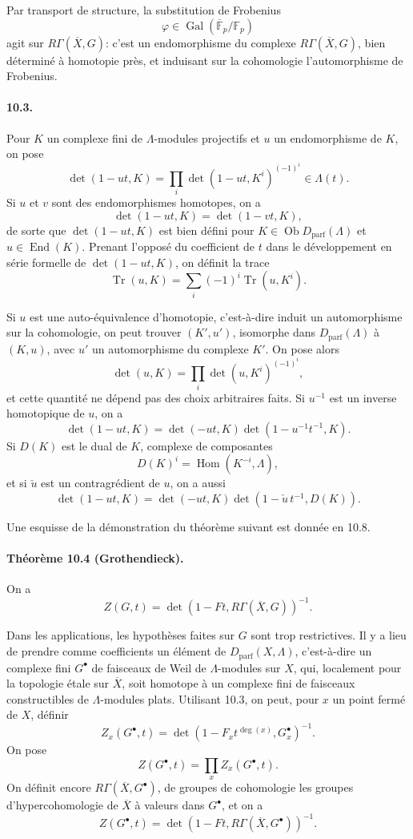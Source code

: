 \documentclass[10pt]{article}
\newcommand{\F}{\mathbb F}
\newcommand{\Gal}{\operatorname{Gal}}
\newcommand{\Hom}{\operatorname{Hom}}
\newcommand{\Tr}{\operatorname{Tr}}
\providecommand{\Gal}{\operatorname{Gal}}
\providecommand{\Hom}{\operatorname{Hom}}
\providecommand{\End}{\operatorname{End}}
\providecommand{\Gal}{\operatorname{Gal}}
\providecommand{\Hom}{\operatorname{Hom}}
\providecommand{\Tr}{\operatorname{Tr}}
\providecommand{\Dparf}{D_{\mathrm{parf}}}
\providecommand{\Gal}{\operatorname{Gal}}
\providecommand{\Hom}{\operatorname{Hom}}
\providecommand{\End}{\operatorname{End}}
\providecommand{\Tr}{\operatorname{Tr}}
\providecommand{\Gal}{\operatorname{Gal}}
\providecommand{\Tr}{\operatorname{Tr}}
\begin{document}
Par transport de structure, la substitution de Frobenius
\[
\varphi\in\Gal(\overline{\F}_p/\F_p)
\]
agit sur \(R\Gamma(\overline X,G)\): c'est un endomorphisme du complexe \(R\Gamma(\overline X,G)\), bien déterminé à homotopie près, et induisant sur la cohomologie l'automorphisme de Frobenius.

\paragraph{10.3.} Pour \(K\) un complexe fini de \(\Lambda\)-modules projectifs et \(u\) un endomorphisme de \(K\), on pose
\[
\tag{10.3.1}
\det(1-ut,K)=
\prod_i\det(1-ut,K^i)^{(-1)^i}\in\Lambda(t).
\]
Si \(u\) et \(v\) sont des endomorphismes homotopes, on a
\[
\det(1-ut,K)=\det(1-vt,K),
\]
de sorte que \(\det(1-ut,K)\) est bien défini pour \(K\in\operatorname{Ob}\Dparf(\Lambda)\) et \(u\in\End(K)\). Prenant l'opposé du coefficient de \(t\) dans le développement en série formelle de \(\det(1-ut,K)\), on définit la trace
\[
\tag{10.3.2}
\Tr(u,K)=\sum_i(-1)^i\Tr(u,K^i).
\]

Si \(u\) est une auto-équivalence d'homotopie, c'est-à-dire induit un automorphisme sur la cohomologie, on peut trouver \((K',u')\), isomorphe dans \(\Dparf(\Lambda)\) à \((K,u)\), avec \(u'\) un automorphisme du complexe \(K'\). On pose alors
\[
\tag{10.3.3}
\det(u,K)=\prod_i\det(u,K^i)^{(-1)^i},
\]
et cette quantité ne dépend pas des choix arbitraires faits. Si \(u^{-1}\) est un inverse homotopique de \(u\), on a
\[
\tag{10.3.4}
\det(1-ut,K)=\det(-ut,K)\det(1-u^{-1}t^{-1},K).
\]
Si \(D(K)\) est le dual de \(K\), complexe de composantes
\[
D(K)^i=\Hom(K^{-i},\Lambda),
\]
et si \(\check u\) est un contragrédient de \(u\), on a aussi
\[
\tag{10.3.5}
\det(1-ut,K)=\det(-ut,K)\det(1-\check u\,t^{-1},D(K)).
\]

Une esquisse de la démonstration du théorème suivant est donnée en 10.8.

\paragraph{Théorème 10.4 (Grothendieck).} On a
\[
\tag{10.4.1}
Z(G,t)=\det(1-Ft,R\Gamma(\overline X,G))^{-1}.
\]

Dans les applications, les hypothèses faites sur \(G\) sont trop restrictives. Il y a lieu de prendre comme coefficients un élément de \(\Dparf(X,\Lambda)\), c'est-à-dire un complexe fini \(G^\bullet\) de faisceaux de Weil de \(\Lambda\)-modules sur \(X\), qui, localement pour la topologie étale sur \(\overline X\), soit homotope à un complexe fini de faisceaux constructibles de \(\Lambda\)-modules plats. Utilisant 10.3, on peut, pour \(x\) un point fermé de \(X\), définir
\[
Z_x(G^\bullet,t)=
\det(1-F_x t^{\deg(x)},G_x^\bullet)^{-1}.
\]
On pose
\[
Z(G^\bullet,t)=\prod_x Z_x(G^\bullet,t).
\]
On définit encore \(R\Gamma(\overline X,G^\bullet)\), de groupes de cohomologie les groupes d'hypercohomologie de \(\overline X\) à valeurs dans \(G^\bullet\), et on a
\[
\tag{10.4.2}
Z(G^\bullet,t)=
\det(1-Ft,R\Gamma(\overline X,G^\bullet))^{-1}.
\]
\end{document}
